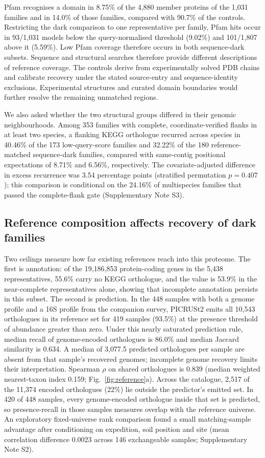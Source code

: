 \documentclass[11pt]{article}
\begin{document}
Pfam recognises a domain in 8.75\% of the 4{,}880 member proteins of the 1{,}031 families and
in 14.0\% of those families, compared with 90.7\% of the controls. Restricting the dark comparison to one representative per family, Pfam hits occur in 93/1{,}031 models below the query-normalised threshold (9.02\%) and 101/1{,}807 above it (5.59\%). Low Pfam coverage therefore occurs in both sequence-dark subsets. Sequence and structural
searches therefore provide different descriptions of reference coverage. The controls derive from experimentally solved PDB chains and calibrate recovery under the stated source-entry and sequence-identity exclusions. Experimental structures and curated domain boundaries would further resolve the remaining unmatched regions.


We also asked whether the two structural groups differed in their genomic neighbourhoods.
Among 353 families with complete, coordinate-verified flanks in at least two species,
a flanking KEGG orthologue recurred across species in 40.46\% of the 173 low-query-score families
and 32.22\% of the 180 reference-matched sequence-dark families, compared with same-contig
positional expectations of 8.71\% and 6.56\%, respectively. The covariate-adjusted difference
in excess recurrence was 3.54 percentage points (stratified permutation $p=0.407$);
this comparison is conditional on the 24.16\% of multispecies families that passed the complete-flank
gate (Supplementary Note S3).

\subsection*{Reference composition affects recovery of dark families}

Two ceilings measure how far existing references reach into this proteome. The first is
annotation: of the 19{,}186{,}853 protein-coding genes in the 5{,}438 representatives, 55.6\% carry
no KEGG orthologue, and the value is 53.9\% in the near-complete representatives alone, showing that incomplete annotation persists in this subset. The second is prediction. In the 448
samples with both a genome profile and a 16S profile from the companion survey, PICRUSt2
emits all 10{,}543 orthologues in its reference set for 419 samples (93.5\%) at the presence
threshold of abundance greater than zero. Under this nearly saturated prediction rule,
median recall of genome-encoded orthologues is 86.0\% and median Jaccard similarity is 0.634.
A median of 3{,}077.5 predicted orthologues per sample are absent from that sample's recovered
genomes; incomplete genome recovery limits their interpretation. Spearman $\rho$ on shared
orthologues is 0.839 (median weighted nearest-taxon index 0.159; Fig.~\ref{fig:reference}a).
Across the catalogue, 2{,}517 of the 11{,}374 encoded orthologues (22\%) lie outside the predictor's
emitted set. In 420 of 448 samples, every genome-encoded orthologue inside that set is predicted,
so presence-recall in those samples measures overlap with the reference universe.
An exploratory fixed-universe rank comparison found a small matching-sample advantage after conditioning on expedition, soil position and site (mean correlation difference 0.0023 across 146 exchangeable samples; Supplementary Note S2).
\end{document}
